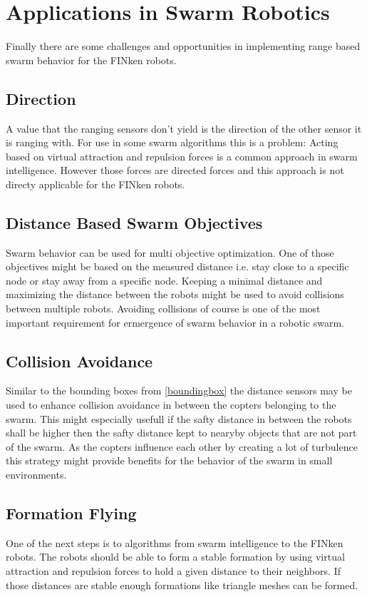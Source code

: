 \section{Applications in Swarm Robotics}

Finally there are some challenges and opportunities in implementing range based swarm behavior for the FINken robots.

\subsection{Direction}
A value that the ranging sensors don't yield is the direction of the other sensor it is ranging with.
For use in some swarm algorithms this is a problem: Acting based on virtual attraction and repulsion forces is a common approach in swarm intelligence.
However those forces are directed forces and this approach is not directy applicable for the FINken robots.


\subsection{Distance Based Swarm Objectives}
Swarm behavior can be used for multi objective optimization.
One of those objectives might be based on the measured distance i.e. stay close to a specific node or stay away from a specific node.
Keeping a minimal distance and maximizing the distance between the robots might be used to avoid collisions between multiple robots.
Avoiding collisions of course is one of the most important requirement for ermergence of swarm behavior in a robotic swarm.

\subsection{Collision Avoidance}
Similar to the bounding boxes from \autoref{boundingbox} the distance sensors may be used to enhance collision avoidance in between the copters belonging to the swarm.
This might especially usefull if the safty distance in between the robots shall be higher then the safty distance kept to nearyby objects that are not part of the swarm.
As the copters influence each other by creating a lot of turbulence this strategy might provide benefits for the behavior of the swarm in small environments.

\subsection{Formation Flying}
One of the next steps is to  algorithms from swarm intelligence to the FINken robots.
The robots should be able to form a stable formation by using virtual attraction and repulsion forces to hold a given distance to their neighbors.
If those distances are stable enough formations like triangle meshes can be formed.

